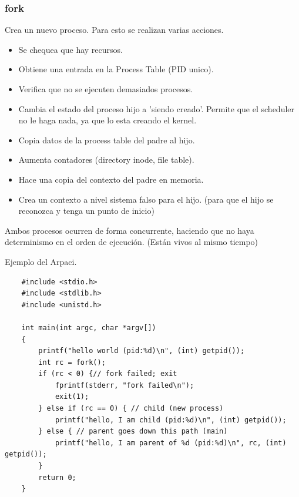 \documentclass[titlepage,a4paper]{article}
\begin{document}
\subsubsection*{fork}
Crea un nuevo proceso. Para esto se realizan varias acciones.
\begin{itemize}
    \item Se chequea que hay recursos.
    \item Obtiene una entrada en la  Process Table (PID unico).
    \item Verifica que no se ejecuten demasiados procesos.
    \item Cambia el estado del proceso hijo a 'siendo creado'. Permite que el scheduler no le haga nada, ya que lo esta creando el kernel.
    \item Copia datos de la process table del padre al hijo.
    \item Aumenta contadores (directory inode, file table).
    \item Hace una copia del contexto del padre en memoria.
    \item Crea un contexto a nivel sistema falso para el hijo. (para que el hijo se reconozca y tenga un punto de inicio)
\end{itemize}

Ambos procesos ocurren de forma concurrente, haciendo que no haya determinismo en el orden de ejecución. (Están vivos al mismo tiempo)

Ejemplo del Arpaci.
\begin{verbatim}
    #include <stdio.h>
    #include <stdlib.h>
    #include <unistd.h>
    
    int main(int argc, char *argv[])
    {
        printf("hello world (pid:%d)\n", (int) getpid());
        int rc = fork();
        if (rc < 0) {// fork failed; exit
            fprintf(stderr, "fork failed\n");
            exit(1);
        } else if (rc == 0) { // child (new process)
            printf("hello, I am child (pid:%d)\n", (int) getpid());
        } else { // parent goes down this path (main)
            printf("hello, I am parent of %d (pid:%d)\n", rc, (int) getpid());
        }
        return 0;
    }
\end{verbatim}
\end{document}
